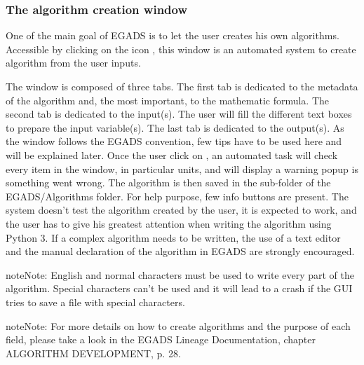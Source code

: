 \documentclass[a4paper,10pt,openany,english]{sphinxmanual}
\let\sphinxpxdimen\pdfpxdimen\else\newdimen\sphinxpxdimen
\begin{document}
\subsubsection{The algorithm creation window}
\label{\detokenize{description:the-algorithm-creation-window}}
One of the main goal of EGADS is to let the user creates his own algorithms. Accessible by clicking on the icon \scalebox{0.120000}{\sphinxincludegraphics[width=130\sphinxpxdimen,height=130\sphinxpxdimen]{{create_algo_icon}.png}}, this window is an automated system to create algorithm from the user inputs.

\noindent{\hspace*{\fill}\scalebox{0.450000}{\sphinxincludegraphics[width=1002\sphinxpxdimen,height=739\sphinxpxdimen]{{EGADS_GUI_017}.png}}\hspace*{\fill}}

The window is composed of three tabs. The first tab is dedicated to the metadata of the algorithm and, the most important, to the mathematic formula. The second tab is dedicated to the input(s). The user will fill the different text boxes to prepare the input variable(s). The last tab is dedicated to the output(s). As the window follows the EGADS convention, few tips have to be used here and will be explained later.  Once the user click on , an automated task will check every item in the window, in particular units, and will display a warning popup is something went wrong. The algorithm is then saved in the  sub-folder of the EGADS/Algorithms folder. For help purpose, few info buttons are present.
The system doesn’t test the algorithm created by the user, it is expected to work, and the user has to give his greatest attention when writing the algorithm using Python 3. If a complex algorithm needs to be written, the use of a text editor and the manual declaration of the algorithm in EGADS are strongly encouraged.

\begin{sphinxadmonition}{note}{Note:}
English and normal characters must be used to write every part of the algorithm. Special characters can’t be used and it will lead to a crash if the GUI tries to save a file with special characters.
\end{sphinxadmonition}

\begin{sphinxadmonition}{note}{Note:}
For more details on how to create algorithms and the purpose of each field, please take a look in the EGADS Lineage Documentation, chapter ALGORITHM DEVELOPMENT, p. 28.
\end{sphinxadmonition}
\end{document}
